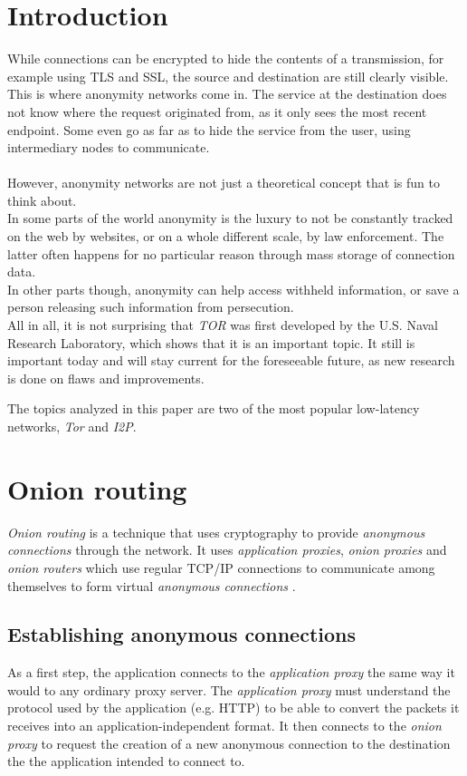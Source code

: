 \documentclass{sig-alternate}
\begin{document}
\section{Introduction}
While connections can be encrypted to hide the contents of a transmission, for example using TLS and SSL, the source and destination are still clearly visible.
\\
This is where anonymity networks come in.
The service at the destination does not know where the request originated from, as it only sees the most recent endpoint.
Some even go as far as to hide the service from the user, using intermediary nodes to communicate.
\\
\\
However, anonymity networks are not just a theoretical concept that is fun to think about.
\\
In some parts of the world anonymity is the luxury to not be constantly tracked on the web by websites, or on a whole different scale, by law enforcement.
The latter often happens for no particular reason through mass storage of connection data.
\\
In other parts though, anonymity can help access withheld information, or save a person releasing such information from persecution.
\\
All in all, it is not surprising that \emph{TOR} was first developed by the U.S. Naval Research Laboratory, which shows that it is an important topic.
It still is important today and will stay current for the foreseeable future, as new research is done on flaws and improvements\cite{craven2010}.

The topics analyzed in this paper are two of the most popular low-latency networks, \emph{Tor} and \emph{I2P}.

\section{Onion routing}
\emph{Onion routing} is a technique that uses cryptography to provide \emph{anonymous connections}
through the network. It uses \emph{application proxies}, \emph{onion proxies} and
\emph{onion routers} which use regular TCP/IP connections to communicate among themselves
to form virtual \emph{anonymous connections} \cite{reed1998}.

\subsection{Establishing anonymous connections}
As a first step, the application connects to the \emph{application proxy} the same way it would to
any ordinary proxy server. The \emph{application proxy} must understand the protocol used by the
application (e.g. HTTP) to be able to convert the packets it receives into an
application-independent format. It then connects to the \emph{onion proxy} to request the
creation of a new anonymous connection to the destination the the application intended to connect to.
\end{document}
